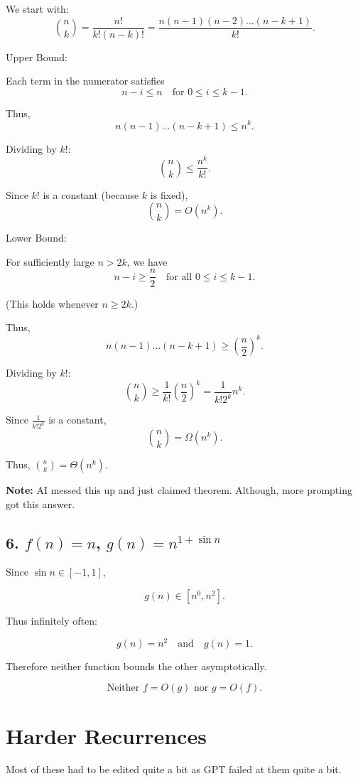 \documentclass[11pt]{article}
\begin{document}
We start with:
\[
\binom{n}{k}
= \frac{n!}{k!(n-k)!}
= \frac{n(n-1)(n-2)\dots(n-k+1)}{k!}.
\]

Upper Bound:

Each term in the numerator satisfies
\[
n-i \le n \quad \text{for } 0 \le i \le k-1.
\]

Thus,
\[
n(n-1)\dots(n-k+1)
\le n^k.
\]

Dividing by $k!$:
\[
\binom{n}{k}
\le \frac{n^k}{k!}.
\]

Since $k!$ is a constant (because $k$ is fixed),
\[
\binom{n}{k} = O(n^k).
\]

Lower Bound:

For sufficiently large $n > 2k$, we have
\[
n-i \ge \frac{n}{2}
\quad \text{for all } 0 \le i \le k-1.
\]

(This holds whenever $n \ge 2k$.)

Thus,
\[
n(n-1)\dots(n-k+1)
\ge \left(\frac{n}{2}\right)^k.
\]

Dividing by $k!$:
\[
\binom{n}{k}
\ge
\frac{1}{k!}\left(\frac{n}{2}\right)^k
=
\frac{1}{k!2^k} n^k.
\]

Since $\frac{1}{k!2^k}$ is a constant,
\[
\binom{n}{k} = \Omega(n^k).
\]

Thus, $\binom{n}{k} = \Theta(n^k)$.

\textbf{Note:} AI messed this up and just claimed theorem. Although, more prompting got this answer.


\newpage

\subsection{6. $f(n)=n$, $g(n)=n^{1+\sin n}$}

Since $\sin n\in[-1,1]$,

\[
g(n)\in[n^0,n^2].
\]

Thus infinitely often:

\[
g(n)=n^2
\quad \text{and} \quad
g(n)=1.
\]

Therefore neither function bounds the other asymptotically.

\[
\boxed{\text{Neither } f=O(g) \text{ nor } g=O(f).}
\]
\newpage
\section{Harder Recurrences}

Most of these had to be edited quite a bit as GPT failed at them quite a bit.
\end{document}
